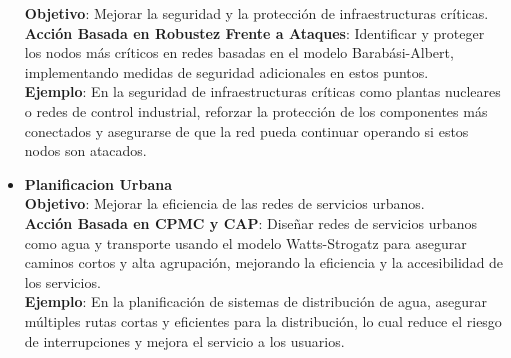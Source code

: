 \begin{itemize}
        \textbf{Objetivo}: Mejorar la seguridad y la protección de infraestructuras críticas.\\
        \textbf{Acción Basada en Robustez Frente a Ataques}: Identificar y proteger los nodos más críticos en redes basadas en el modelo Barabási-Albert, implementando medidas de seguridad adicionales en estos puntos.\\
        \textbf{Ejemplo}: En la seguridad de infraestructuras críticas como plantas nucleares o redes de control industrial, reforzar la protección de los componentes más conectados y asegurarse de que la red pueda continuar operando si estos nodos son atacados.\\
    \item \textbf{Planificacion Urbana}\\
        \textbf{Objetivo}: Mejorar la eficiencia de las redes de servicios urbanos.\\
        \textbf{Acción Basada en CPMC y CAP}: Diseñar redes de servicios urbanos como agua y transporte usando el modelo Watts-Strogatz para asegurar caminos cortos y alta agrupación, mejorando la eficiencia y la accesibilidad de los servicios.\\
        \textbf{Ejemplo}: En la planificación de sistemas de distribución de agua, asegurar múltiples rutas cortas y eficientes para la distribución, lo cual reduce el riesgo de interrupciones y mejora el servicio a los usuarios.\\
\end{itemize}

